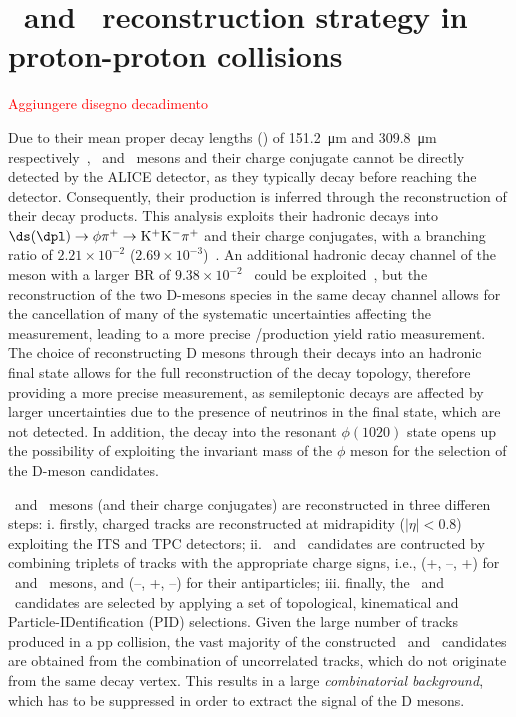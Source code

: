 \chapter{\texorpdfstring{\dpl\ and \ds\ reconstruction strategy in proton-proton collisions}{D+ and Ds+ reconstruction strategy in proton-proton collisions}}\label{chap:reconstruction}

\textcolor{red}{Aggiungere disegno decadimento}

Due to their mean proper decay lengths (\ct) of \SI{151.2}{\micro\meter} and \SI{309.8}{\micro\meter} respectively~\cite{pdg}, \ds\ and \dpl\ mesons and their charge conjugate cannot be directly detected by the ALICE detector, as they typically decay before reaching the detector. Consequently, their production is inferred through the reconstruction of their decay products. This analysis exploits their hadronic decays into $\ds (\dpl) \rightarrow \mathrm{\phi\pi^+ \rightarrow K^+K^-\pi^+}$ and their charge conjugates, with a branching ratio of $2.21\times10^{-2}$ ($2.69\times10^{-3}$)~\cite{pdg}. An additional hadronic decay channel of the \dpl meson with a larger BR of $9.38\times10^{-2}$~\cite{pdg} could be exploited~\cite{ALICE:2017olh}, but the reconstruction of the two D-mesons species in the same decay channel allows for the cancellation of many of the systematic uncertainties affecting the measurement, leading to a more precise \ds/\dpl production yield ratio measurement. The choice of reconstructing D mesons through their decays into an hadronic final state allows for the full reconstruction of the decay topology, therefore providing a more precise measurement, as semileptonic decays are affected by larger uncertainties due to the presence of neutrinos in the final state, which are not detected. In addition, the decay into the resonant $\phi(1020)$ state opens up the possibility of exploiting the invariant mass of the $\phi$ meson for the selection of the D-meson candidates.

\ds\ and \dpl\ mesons (and their charge conjugates) are reconstructed in three differen steps: i. firstly, charged tracks are reconstructed at midrapidity ($\lvert\eta\rvert < 0.8$) exploiting the ITS and TPC detectors; ii. \ds\ and \dpl\ candidates are contructed by combining triplets of tracks with the appropriate charge signs, i.e., (+, --, +) for \ds\ and \dpl\ mesons, and (--, +, --) for their antiparticles; iii. finally, the \ds\ and \dpl\ candidates are selected by applying a set of topological, kinematical and Particle-IDentification (PID)  selections. Given the large number of tracks produced in a pp collision, the vast majority of the constructed \ds\ and \dpl\ candidates are obtained from the combination of uncorrelated tracks, which do not originate from the same decay vertex. This results in a large \emph{combinatorial background}, which has to be suppressed in order to extract the signal of the D mesons. 

